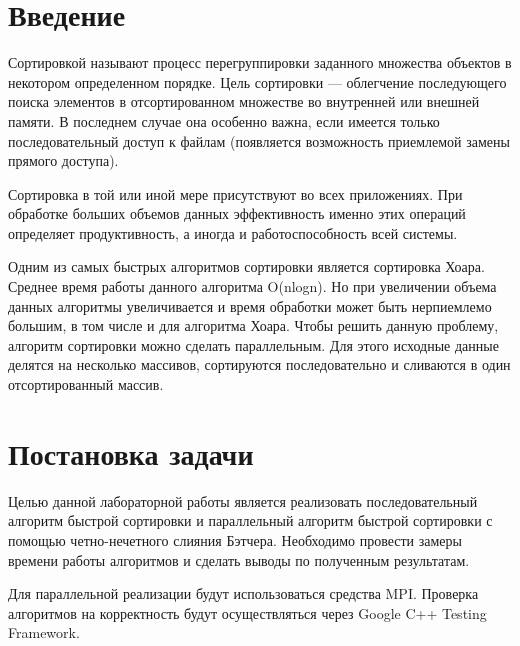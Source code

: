 \documentclass{report}
\begin{document}
\setcounter{page}{2}

\tableofcontents
\newpage

\section*{Введение}
Сортировкой называют процесс перегруппировки заданного множества объектов в некотором определенном порядке. 
Цель сортировки — облегчение последующего поиска элементов в отсортированном множестве во внутренней или внешней памяти. В последнем случае она особенно важна, если имеется только последовательный доступ к файлам (появляется возможность приемлемой замены прямого доступа).
\par Сортировка в той или иной мере присутствуют во всех приложениях. При обработке больших объемов данных эффективность именно этих операций определяет продуктивность, а иногда и работоспособность всей системы.
\par Одним из самых быстрых алгоритмов сортировки является сортировка Хоара. Среднее время работы данного алгоритма O(nlogn).  Но при увеличении объема данных алгоритмы увеличивается и время обработки может быть нерпиемлемо большим, в том числе и для алгоритма Хоара. Чтобы решить данную проблему, алгоритм сортировки можно сделать параллельным. Для этого исходные данные делятся на несколько массивов, сортируются последовательно и сливаются в один отсортированный массив. 
\newpage

\section*{Постановка задачи}
Целью данной лабораторной работы является реализовать последовательный алгоритм быстрой сортировки и параллельный алгоритм быстрой сортировки с помощью четно-нечетного слияния Бэтчера.  Необходимо провести замеры времени работы алгоритмов и сделать выводы по полученным результатам.
\par Для параллельной реализации будут использоваться средства MPI. Проверка алгоритмов на корректность будут осуществляться через Google C++ Testing Framework.
\newpage

\end{document}
